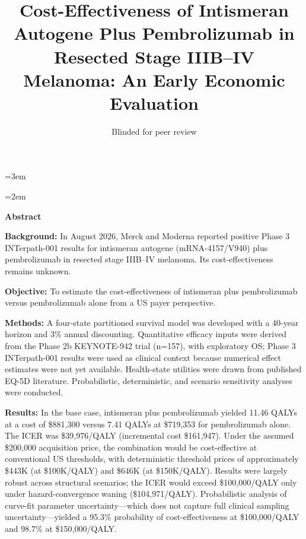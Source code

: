 \documentclass[12pt,a4paper]{article}
\title{\textbf{Cost-Effectiveness of Intismeran Autogene Plus Pembrolizumab in Resected Stage IIIB–IV Melanoma: An Early Economic Evaluation}}
\author{Blinded for peer review}
\date{}
\begin{document}
\emergencystretch=3em
\hfuzz=1pt

\maketitle
\thispagestyle{empty}

\newpage

\begingroup
\onehalfspacing
\emergencystretch=2em
\setlength{\parindent}{0pt}
\begin{center}
{\large\bfseries Abstract}
\end{center}

\textbf{Background:} In August 2026, Merck and Moderna reported positive Phase 3 \mbox{INTerpath-001} results for intismeran autogene (mRNA-4157/V940) plus \mbox{pembrolizumab} in resected stage IIIB--IV melanoma. Its cost-effectiveness remains unknown.

\textbf{Objective:} To estimate the cost-effectiveness of intismeran plus \mbox{pembrolizumab} versus \mbox{pembrolizumab} alone from a US payer perspective.

\textbf{Methods:} A four-state partitioned survival model was developed with a 40-year horizon and 3\% annual discounting. Quantitative efficacy inputs were derived from the Phase 2b \mbox{KEYNOTE-942} trial (n=157), with exploratory OS; Phase 3 \mbox{INTerpath-001} results were used as clinical context because numerical effect estimates were not yet available. Health-state utilities were drawn from published EQ-5D literature. Probabilistic, deterministic, and scenario sensitivity analyses were conducted.

\textbf{Results:} In the base case, intismeran plus \mbox{pembrolizumab} yielded 11.46 QALYs at a cost of \$881,300 versus 7.41 QALYs at \$719,353 for \mbox{pembrolizumab} alone. The ICER was \$39,976/QALY (incremental cost \$161,947). Under the assumed \$200,000 acquisition price, the combination would be cost-effective at conventional US thresholds, with deterministic threshold prices of approximately \$443K (at \$100K/QALY) and \$646K (at \$150K/QALY). Results were largely robust across structural scenarios; the ICER would exceed \$100,000/QALY only under hazard-convergence waning (\$104,971/QALY). Probabilistic analysis of curve-fit parameter uncertainty---which does not capture full clinical sampling uncertainty---yielded a 95.3\% probability of cost-effectiveness at \$100,000/QALY and 98.7\% at \$150,000/QALY.
\end{document}
